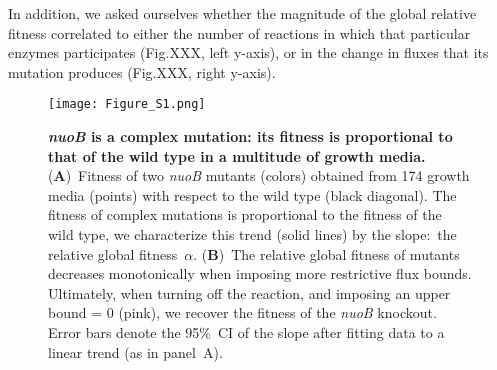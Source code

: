 \documentclass{article}
\begin{document}
In addition, we asked ourselves whether the magnitude of the global relative fitness correlated to either the number of reactions in which that particular enzymes participates (Fig.XXX, left y-axis), or in the change in fluxes that its mutation produces (Fig.XXX, right y-axis). 


\begin{figure}[h!]
\centering
\texttt{[image: Figure\_S1.png]}
\caption{ {\bf {\it nuoB} is a complex mutation: its fitness is proportional to that of the wild type in a multitude of growth media.}
({\bf A})~Fitness of two {\it nuoB} mutants (colors) obtained from 174 growth media (points) with respect to the wild type (black diagonal). The fitness of complex mutations is proportional to the fitness of the wild type, we characterize this trend (solid lines) by the slope:~the relative global fitness~$\alpha$.
({\bf B})~The relative global fitness of mutants decreases monotonically when imposing more restrictive flux bounds. Ultimately, when turning off the reaction, and imposing an upper bound = 0 (pink), we recover the fitness of the {\it nuoB} knockout. Error bars denote the 95\%~CI of the slope after fitting data to a linear trend (as in panel~A).
}
\label{fig:FigS1}
\end{figure}



\end{document}
